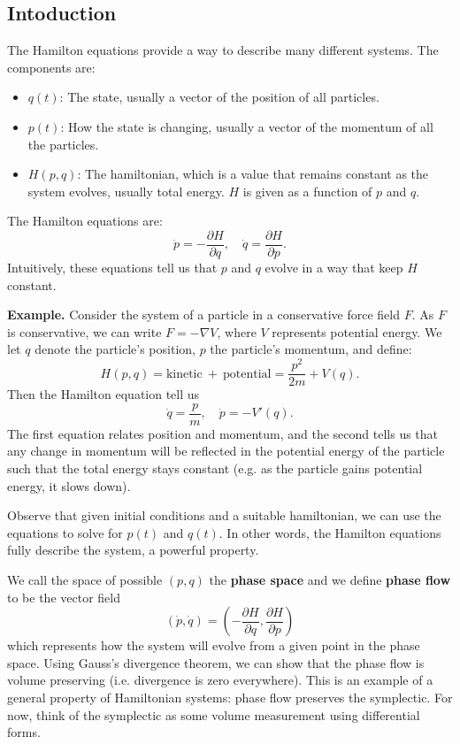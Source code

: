 \subsection{Intoduction}
The Hamilton equations provide a way to describe many different systems. The components are:
\begin{itemize}
    \item $q(t)$: The state, usually a vector of the position of all particles.
    \item $p(t)$: How the state is changing, usually a vector of the momentum of all the particles.
    \item $H(p, q)$: The hamiltonian, which is a value that remains constant as the system evolves, usually total energy. $H$ is given as a function of $p$ and $q$.
\end{itemize}
The Hamilton equations are:
\[
    \dot{p} = - \frac{\partial H}{\partial q}, \quad \dot{q} = \frac{\partial H}{\partial p}.
\]
Intuitively, these equations tell us that $p$ and $q$ evolve in a way that keep $H$ constant.

\hsep

\noindent
\textbf{Example.} Consider the system of a particle in a conservative force field $F$. As $F$ is conservative, we can write $F = -\nabla V$, where $V$ represents potential energy. We let $q$ denote the particle's position, $p$ the particle's momentum, and define:
\[
    H(p, q) = \text{kinetic} \ + \ \text{potential} = \frac{p^2}{2m} + V(q).
\]
Then the Hamilton equation tell us
\[
    \dot{q} = \frac{p}{m}, \quad \dot{p} = - V'(q).
\]
The first equation relates position and momentum, and the second tells us that any change in momentum will be reflected in the potential energy of the particle such that the total energy stays constant (e.g. as the particle gains potential energy, it slows down).

\hsep

Observe that given initial conditions and a suitable hamiltonian, we can use the equations to solve for $p(t)$ and $q(t)$. In other words, the Hamilton equations fully describe the system, a powerful property.

We call the space of possible $(p, q)$ the \textbf{phase space} and we define \textbf{phase flow} to be the vector field
\[
    (\dot{p}, \dot{q}) = \left( - \frac{\partial H}{\partial q}, \frac{\partial H}{\partial p}\right)
\]
which represents how the system will evolve from a given point in the phase space. Using Gauss's divergence theorem, we can show that the phase flow is volume preserving (i.e. divergence is zero everywhere). This is an example of a general property of Hamiltonian systems: phase flow preserves the symplectic. For now, think of the symplectic as some volume measurement using differential forms.
